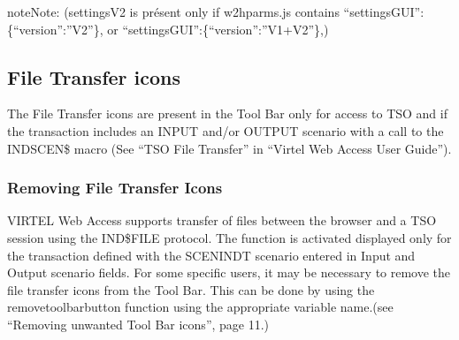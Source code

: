 \documentclass[letterpaper,10pt,english]{sphinxmanual}
\begin{document}
\begin{sphinxadmonition}{note}{Note:}
(settingsV2 is présent only if w2hparms.js contains “settingsGUI”:\{“version”:”V2”\}, or “settingsGUI”:\{“version”:”V1+V2”\},)
\end{sphinxadmonition}

\ignorespaces 
{}\ignorespaces 

\subsection{File Transfer icons}
\label{\detokenize{Customization:file-transfer-icons}}\label{\detokenize{Customization:index-29}}
The File Transfer icons are present in the Tool Bar only for access to TSO and if the transaction includes an INPUT and/or OUTPUT scenario with a call to the INDSCEN\$ macro (See “TSO File Transfer” in “Virtel Web Access User Guide”).

\ignorespaces 

\subsubsection{Removing File Transfer Icons}
\label{\detokenize{Customization:removing-file-transfer-icons}}\label{\detokenize{Customization:index-30}}
VIRTEL Web Access supports transfer of files between the browser and a TSO session using the IND\$FILE protocol. The function is activated displayed only for the transaction defined with the SCENINDT scenario entered in Input and Output scenario fields. For some specific users, it may be necessary to remove the file transfer icons from the Tool Bar.
This can be done by using the removetoolbarbutton function using the appropriate variable name.(see “Removing unwanted Tool Bar icons”, page 11.)

\ignorespaces 
\end{document}
